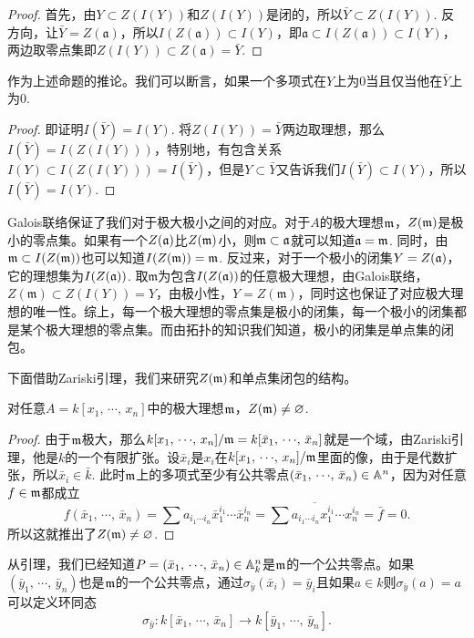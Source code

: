 \begin{proof} 首先，由$Y\subset Z(I(Y))$和$Z(I(Y))$是闭的，所以$\bar{Y}\subset Z(I(Y))$. 反方向，让$\bar{Y}=Z(\mathfrak{a})$，所以$I(Z(\mathfrak{a}))\subset I(Y)$，即$\mathfrak{a}\subset I(Z(\mathfrak{a}))\subset I(Y)$，两边取零点集即$Z(I(Y))\subset Z(\mathfrak{a})=\bar{Y}$. \end{proof}

作为上述命题的推论。我们可以断言，如果一个多项式在$Y$上为$0$当且仅当他在$\bar{Y}$上为$0$. 

\begin{proof} 即证明$I(\bar{Y})=I(Y)$. 将$Z(I(Y))=\bar{Y}$两边取理想，那么$I(\bar{Y})=I(Z(I(Y)))$，特别地，有包含关系$I(Y)\subset I(Z(I(Y)))=I(\bar{Y})$，但是$Y\subset \bar{Y}$又告诉我们$I(\bar{Y})\subset I(Y)$，所以$I(\bar{Y})=I(Y)$. \end{proof}

\para Galois联络保证了我们对于极大极小之间的对应。对于$A$的极大理想$\mathfrak{m}$，$Z(\mathfrak{m})$是极小的零点集。如果有一个$Z(\mathfrak{a})$比$Z(\mathfrak{m})$小，则$\mathfrak{m}\subset \mathfrak{a}$就可以知道$\mathfrak{a}=\mathfrak{m}$. 同时，由$\mathfrak{m} \subset I(Z(\mathfrak{m}))$也可以知道$I(Z(\mathfrak{m}))=\mathfrak{m}$. 反过来，对于一个极小的闭集$Y=Z(\mathfrak{a})$，它的理想集为$I(Z(\mathfrak{a}))$. 取$\mathfrak{m}$为包含$I(Z(\mathfrak{a}))$的任意极大理想，由Galois联络，$Z(\mathfrak{m})\subset Z(I(Y))=Y$，由极小性，$Y=Z(\mathfrak{m})$，同时这也保证了对应极大理想的唯一性。综上，每一个极大理想的零点集是极小的闭集，每一个极小的闭集都是某个极大理想的零点集。而由拓扑的知识我们知道，极小的闭集是单点集的闭包。

下面借助Zariski引理，我们来研究$Z(\mathfrak{m})$和单点集闭包的结构。

\begin{lem}
对任意$A=k[x_1,\,\cdots\!,\,x_n]$中的极大理想$\mathfrak{m}$，$Z(\mathfrak{m})\neq\varnothing$.
\end{lem}

\begin{proof} 由于$\mathfrak{m}$极大，那么$k[x_1,\,\cdots\!,\,x_n]/\mathfrak{m}=k[\bar{x}_1,\,\cdots\!,\,\bar{x}_n]$就是一个域，由Zariski引理，他是$k$的一个有限扩张。设$\bar{x}_i$是$x_i$在$k[x_1,\,\cdots\!,\,x_n]/\mathfrak{m}$里面的像，由于是代数扩张，所以$\bar{x}_i\in \bar{k}$. 此时$\mathfrak{m}$上的多项式至少有公共零点$(\bar{x}_1,\,\cdots\!,\,\bar{x}_n)\in \mathbb{A}^n$，因为对任意$f\in \mathfrak{m}$都成立
\[
	f(\bar{x}_1,\,\cdots\!,\,\bar{x}_n)=\sum a_{i_1\cdots i_n} {\bar{x}}_1^{i_1}\cdots {\bar{x}}_n^{i_n}=\overline{\sum a_{i_1\cdots i_n} x_1^{i_1}\cdots x_n^{i_n}}=\bar{f}=0.
\]
所以这就推出了$Z(\mathfrak{m})\neq\varnothing$.\end{proof} 

从引理，我们已经知道$P=(\bar{x}_1,\,\cdots\!,\,\bar{x}_n)\in \mathbb{A}^n_k$是$\mathfrak{m}$的一个公共零点。如果$(\bar{y}_1,\,\cdots\!,\,\bar{y}_n)$也是$\mathfrak{m}$的一个公共零点，通过$\sigma_{\bar{y}}(\bar{x}_i)=\bar{y}_i$且如果$a\in k$则$\sigma_{\bar{y}}(a)=a$可以定义环同态
\[
	\sigma_{\bar{y}}:k[\bar{x}_1,\,\cdots\!,\,\bar{x}_n]\to k[\bar{y}_1,\,\cdots\!,\,\bar{y}_n].
\]

